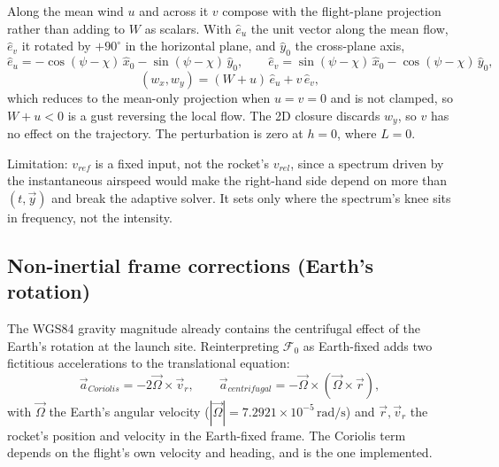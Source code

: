 Along the mean wind $u$ and across it $v$ compose with the flight-plane projection rather than
adding to $W$ as scalars. With $\hat{e}_u$ the unit vector along the mean flow, $\hat{e}_v$ it
rotated by $+90^\circ$ in the horizontal plane, and $\hat{y}_0$ the cross-plane axis,
\begin{equation} \label{eq:dryden_composition}
    \hat{e}_u = -\cos(\psi-\chi)\,\hat{x}_0 - \sin(\psi-\chi)\,\hat{y}_0, \qquad
    \hat{e}_v = \sin(\psi-\chi)\,\hat{x}_0 - \cos(\psi-\chi)\,\hat{y}_0,
\end{equation}
\begin{equation} \label{eq:dryden_wind}
    (w_x,w_y) = (W+u)\,\hat{e}_u + v\,\hat{e}_v,
\end{equation}
which reduces to the mean-only projection when $u=v=0$ and is not clamped, so $W+u<0$ is a gust
reversing the local flow. The 2D closure discards $w_y$, so $v$ has no effect on the trajectory.
The perturbation is zero at $h=0$, where $L=0$.

Limitation: $v_{ref}$ is a fixed input, not the rocket's $v_{rel}$, since a spectrum driven by the
instantaneous airspeed would make the right-hand side depend on more than $(t,\vec{y})$ and break
the adaptive solver. It sets only where the spectrum's knee sits in frequency, not the intensity.


\subsection{Non-inertial frame corrections (Earth's rotation)}\label{sec:noninertial}
The WGS84 gravity magnitude already contains the centrifugal effect of the Earth's rotation at the
launch site. Reinterpreting $\mathcal{F}_0$ as Earth-fixed adds two fictitious accelerations to the
translational equation:
\begin{equation}
    \vec{a}_{Coriolis} = -2\vec{\Omega}\times\vec{v}_r, \qquad
    \vec{a}_{centrifugal} = -\vec{\Omega}\times(\vec{\Omega}\times\vec{r}),
\end{equation}
with $\vec{\Omega}$ the Earth's angular velocity ($|\vec{\Omega}|=7.2921\times10^{-5}\,
\mathrm{rad/s}$) and $\vec{r},\vec{v}_r$ the rocket's position and velocity in the Earth-fixed
frame. The Coriolis term depends on the flight's own velocity and heading, and is the one
implemented.

